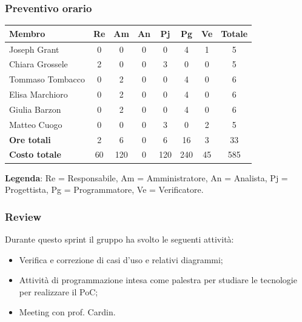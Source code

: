 \documentclass[11pt,a4paper]{article}
\begin{document}
\subsubsection{Preventivo orario}
\begin{center}
    \begin{tabular}{|l|c|c|c|c|c|c|c|}
        \hline
        \textbf{Membro} & \textbf{Re} & \textbf{Am} & \textbf{An} & \textbf{Pj} & \textbf{Pg} & \textbf{Ve} & \textbf{Totale} \\
        \hline
        Joseph Grant & 0 & 0 & 0 & 0 & 4 & 1 & 5 \\
        \hline
        Chiara Grossele & 2 & 0 & 0 & 3 & 0 & 0 & 5 \\
        \hline
        Tommaso Tombacco & 0 & 2 & 0 & 0 & 4 & 0 & 6 \\
        \hline
        Elisa Marchioro & 0 & 2 & 0 & 0 & 4 & 0 & 6 \\
        \hline
        Giulia Barzon & 0 & 2 & 0 & 0 & 4 & 0 & 6 \\
        \hline
        Matteo Cuogo & 0 & 0 & 0 & 3 & 0 & 2 & 5 \\
        \hline
        \textbf{Ore totali} & 2 & 6 & 0 & 6 & 16 & 3 & 33 \\
        \hline
        \textbf{Costo totale} & 60 & 120 & 0 & 120 & 240 & 45 & 585 \\
        \hline
    \end{tabular}
\end{center}

\noindent \textbf{Legenda}: Re = Responsabile, Am = Amministratore, An = Analista, Pj = Progettista, Pg = Programmatore, Ve = Verificatore.

\subsubsection{Review}
Durante questo sprint il gruppo ha svolto le seguenti attività:

\begin{itemize}
        \item Verifica e correzione di casi d'uso e relativi diagrammi;
        \item Attività di programmazione intesa come palestra per studiare le tecnologie per realizzare il PoC;
        \item Meeting con prof. Cardin.
    \end{itemize}
\end{document}
